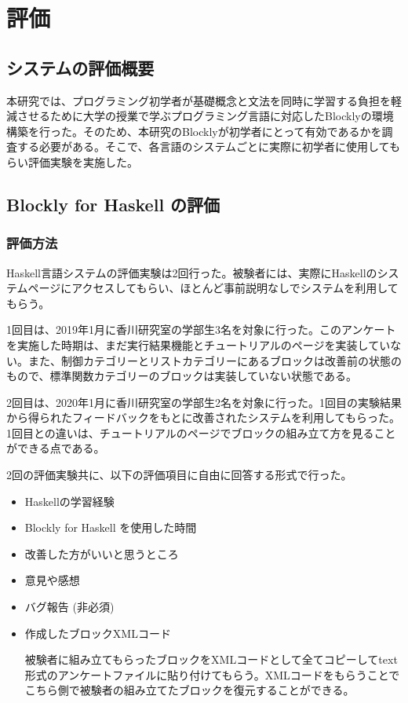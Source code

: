 \documentclass{risepaper}
\begin{document}
   \chapter{評価}
   
   \section{システムの評価概要}
   
本研究では、プログラミング初学者が基礎概念と文法を同時に学習する負担を軽減させるために大学の授業で学ぶプログラミング言語に対応したBlocklyの環境構築を行った。そのため、本研究のBlocklyが初学者にとって有効であるかを調査する必要がある。そこで、各言語のシステムごとに実際に初学者に使用してもらい評価実験を実施した。

   \section{Blockly for Haskell の評価}
   
   		\subsection{評価方法}
Haskell言語システムの評価実験は2回行った。被験者には、実際にHaskellのシステムページにアクセスしてもらい、ほとんど事前説明なしでシステムを利用してもらう。

1回目は、2019年1月に香川研究室の学部生3名を対象に行った。このアンケートを実施した時期は、まだ実行結果機能とチュートリアルのページを実装していない。また、制御カテゴリーとリストカテゴリーにあるブロックは改善前の状態のもので、標準関数カテゴリーのブロックは実装していない状態である。

2回目は、2020年1月に香川研究室の学部生2名を対象に行った。1回目の実験結果から得られたフィードバックをもとに改善されたシステムを利用してもらった。1回目との違いは、チュートリアルのページでブロックの組み立て方を見ることができる点である。

2回の評価実験共に、以下の評価項目に自由に回答する形式で行った。

\begin{itemize}
\item Haskellの学習経験
\item Blockly for Haskell を使用した時間
\item 改善した方がいいと思うところ
\item 意見や感想
\item バグ報告 (非必須)
\item 作成したブロックXMLコード

被験者に組み立てもらったブロックをXMLコードとして全てコピーしてtext形式のアンケートファイルに貼り付けてもらう。XMLコードをもらうことでこちら側で被験者の組み立てたブロックを復元することができる。
\end{itemize} 
\end{document}
